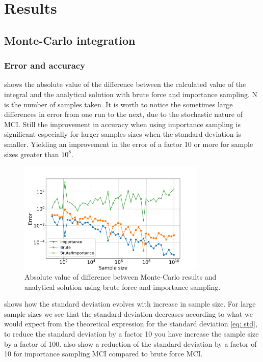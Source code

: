 \section{Results}

\subsection{Monte-Carlo integration}

\subsubsection{Error and accuracy}

 shows the absolute value of the difference between the
calculated value of the integral and the analytical solution with brute force
and importance sampling. N is the number of samples taken. It is worth to notice the sometimes
large differences in error from one run to the next, due to the stochastic nature of
MCI. Still the improvement in accuracy when using importance sampling
is significant especially for larger samples sizes when the standard
deviation is smaller. Yielding an improvement in the error of a factor 10 or
more for sample sizes greater than $10^8$.


\begin{figure}[H]
  \centering
  \includegraphics[width=0.8\textwidth]{../figures/mc_error.png}
  \caption{Absolute value of difference between Monte-Carlo results and analytical
  solution using brute force and importance sampling.}

  \label{fig:mc_error}
\end{figure}


 shows how the standard deviation evolves with increase in
sample size. For large sample sizes we see that the standard deviation decreases
according to what we would expect from the theoretical expression for the standard
deviation \cref{eq: std}, to reduce the standard deviation by a factor 10 you have increase the
sample size by a factor of 100.
 also show a reduction of the standard deviation by a
factor of 10 for importance sampling MCI compared to brute force MCI.

